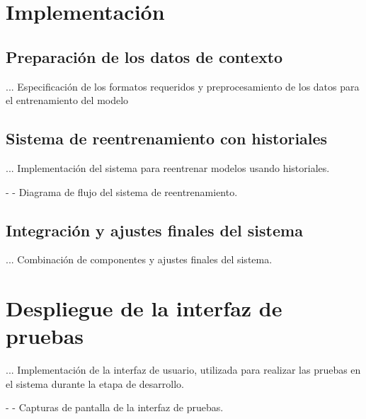 \section{Implementación} 
\subsection{Preparación de los datos de contexto} 
... Especificación de los formatos requeridos y preprocesamiento de los datos para el entrenamiento del modelo

\subsection{Sistema de reentrenamiento con historiales} 
... Implementación del sistema para reentrenar modelos usando historiales.

- - Diagrama de flujo del sistema de reentrenamiento.


\subsection{Integración y ajustes finales del sistema} 
... Combinación de componentes y ajustes finales del sistema.


\section{Despliegue de la interfaz de pruebas} 
... Implementación de la interfaz de usuario, utilizada para realizar las pruebas en el sistema durante la etapa de desarrollo.

- - Capturas de pantalla de la interfaz de pruebas.


